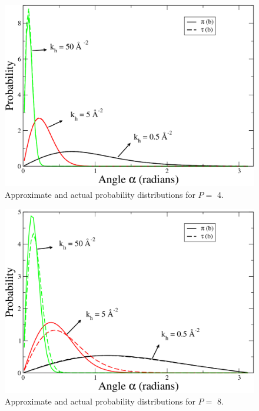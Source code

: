                 \begin{figure}[!htbp]
                    \centering
                    \includegraphics[scale=0.20,keepaspectratio]{Chapter-4/Figures/phi2B.png}
                    \caption{Approximate and actual probability distributions for $P =$ 4.}
                    \label{fig:phi2B}
                \end{figure}

                \begin{figure}[!htbp]
                    \centering
                    \includegraphics[scale=0.20,keepaspectratio]{Chapter-4/Figures/phi4B.png}
                    \caption{Approximate and actual probability distributions for $P =$ 8.}
                    \label{fig:phi4B}
                \end{figure}

